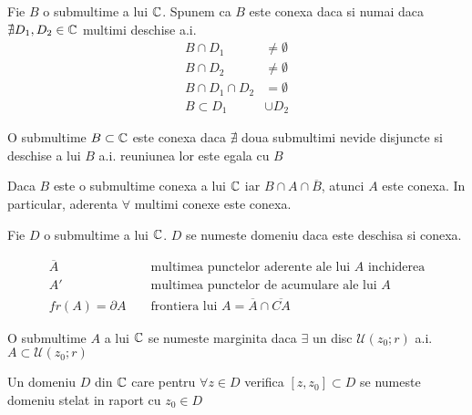 \begin{definition}
	Fie $B$ o submultime a lui $\mathbb{C}$. Spunem ca $B$ este conexa daca si numai
	daca $\nexists D_1, D_2 \in \mathbb{C}$ multimi deschise a.i.
	\begin{align*}
		B \cap D_1 &\neq \emptyset \\
		B \cap D_2 &\neq \emptyset \\
		B \cap D_1 \cap D_2 &= \emptyset \\
		B \subset D_1 &\cup D_2
	\end{align*}
\end{definition}

\begin{definition}
	O submultime $B \subset \mathbb{C}$ este conexa daca $\nexists$ doua submultimi
	nevide disjuncte si deschise a lui $B$ a.i. reuniunea lor este egala cu $B$
\end{definition}

\begin{observation}
	Daca $B$ este o submultime conexa a lui $\mathbb{C}$ iar $B \cap A \cap	\overline{B}$,
	atunci $A$ este conexa. In particular, aderenta $\forall$ multimi conexe este conexa.
\end{observation}

\begin{definition}
	Fie $D$ o submultime a lui $\mathbb{C}$. $D$ se numeste domeniu daca este deschisa si conexa.
\end{definition}

\begin{notation}
	\begin{align*}
		\overline{A} && \text{ multimea punctelor aderente ale lui } A \text{ inchiderea} \\
		A' && \text { multimea punctelor de acumulare ale lui } A \\
		fr(A) = \partial A && \text { frontiera lui } A = \overline{A} \cap \overline{CA}
	\end{align*}
\end{notation}

\begin{definition}
 	O  submultime $A$ a lui $\mathbb{C}$ se numeste marginita daca $\exists$ un disc
 	$\mathcal{U}(z_0;r)$ a.i. $A \subset \mathcal{U}(z_0;r)$
\end{definition}

\begin{definition}
	Un domeniu $D$ din $\mathbb{C}$ care pentru $\forall z \in D$ verifica
	$[z,z_0]\subset D$ se numeste domeniu stelat in raport cu $z_0 \in D$
\end{definition}

